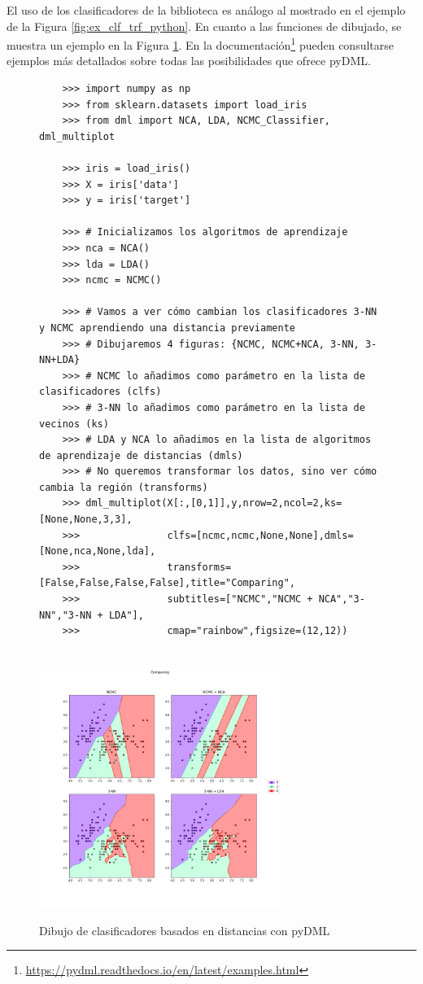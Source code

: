 El uso de los clasificadores de la biblioteca es análogo al mostrado en el ejemplo de la Figura \ref{fig:ex_clf_trf_python}. En cuanto a las funciones de dibujado, se muestra un ejemplo en la Figura \ref{fig:ex_dmlplot}. En la documentación\footnote{\url{https://pydml.readthedocs.io/en/latest/examples.html}} pueden consultarse ejemplos más detallados sobre todas las posibilidades que ofrece pyDML.

\begin{figure}[h]
\begin{verbatim}
    >>> import numpy as np
    >>> from sklearn.datasets import load_iris
    >>> from dml import NCA, LDA, NCMC_Classifier, dml_multiplot

    >>> iris = load_iris()
    >>> X = iris['data']
    >>> y = iris['target']

    >>> # Inicializamos los algoritmos de aprendizaje
    >>> nca = NCA()
    >>> lda = LDA()
    >>> ncmc = NCMC()

    >>> # Vamos a ver cómo cambian los clasificadores 3-NN y NCMC aprendiendo una distancia previamente
    >>> # Dibujaremos 4 figuras: {NCMC, NCMC+NCA, 3-NN, 3-NN+LDA}
    >>> # NCMC lo añadimos como parámetro en la lista de clasificadores (clfs)
    >>> # 3-NN lo añadimos como parámetro en la lista de vecinos (ks)
    >>> # LDA y NCA lo añadimos en la lista de algoritmos de aprendizaje de distancias (dmls)
    >>> # No queremos transformar los datos, sino ver cómo cambia la región (transforms)
    >>> dml_multiplot(X[:,[0,1]],y,nrow=2,ncol=2,ks=[None,None,3,3],
    >>>               clfs=[ncmc,ncmc,None,None],dmls=[None,nca,None,lda],
    >>>               transforms=[False,False,False,False],title="Comparing",
    >>>               subtitles=["NCMC","NCMC + NCA","3-NN","3-NN + LDA"],
    >>>               cmap="rainbow",figsize=(12,12))
\end{verbatim}
\\
\centering
\includegraphics[width=0.7\textwidth]{images/plotdoc7.png}

\caption{Dibujo de clasificadores basados en distancias con pyDML} \label{fig:ex_dmlplot}
\end{figure}

